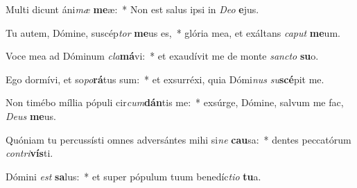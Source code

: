 \item Multi dicunt áni\textit{mæ} \textbf{me}æ:~* Non est salus ipsi in \textit{De}\textit{o} \textbf{e}jus.
\item Tu autem, Dómine, suscép\textit{tor} \textbf{me}us es,~* glória mea, et exáltans \textit{ca}\textit{put} \textbf{me}um.
\item Voce mea ad Dóminum \textit{cla}\textbf{má}vi:~* et exaudívit me de monte \textit{sanc}\textit{to} \textbf{su}o.
\item Ego dormívi, et so\textit{po}\textbf{rá}tus sum:~* et exsurréxi, quia Dómi\textit{nus} \textit{su}\textbf{scé}pit me.
\item Non timébo míllia pópuli cir\textit{cum}\textbf{dán}tis me:~* exsúrge, Dómine, salvum me fac, \textit{De}\textit{us} \textbf{me}us.
\item Quóniam tu percussísti omnes adversántes mihi si\textit{ne} \textbf{cau}sa:~* dentes peccatórum \textit{con}\textit{tri}\textbf{vís}ti.
\item Dómini \textit{est} \textbf{sa}lus:~* et super pópulum tuum benedíc\textit{ti}\textit{o} \textbf{tu}a.
